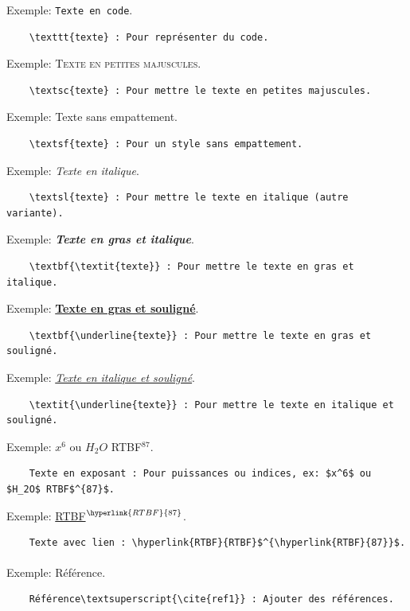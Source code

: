 \documentclass[a4paper, 12pt]{article}
\begin{document}
    Exemple: \texttt{Texte en code}.
    \begin{verbatim}
    \texttt{texte} : Pour représenter du code.
    \end{verbatim}
    
    Exemple: \textsc{Texte en petites majuscules}.
    \begin{verbatim}
    \textsc{texte} : Pour mettre le texte en petites majuscules.
    \end{verbatim}
    
    Exemple: \textsf{Texte sans empattement}.
    \begin{verbatim}
    \textsf{texte} : Pour un style sans empattement.
    \end{verbatim}
    
    Exemple: \textsl{Texte en italique}.
    \begin{verbatim}
    \textsl{texte} : Pour mettre le texte en italique (autre variante).
    \end{verbatim}
    
    Exemple: \textbf{\textit{Texte en gras et italique}}.
    \begin{verbatim}
    \textbf{\textit{texte}} : Pour mettre le texte en gras et italique.
    \end{verbatim}

    Exemple: \textbf{\underline{Texte en gras et souligné}}.
    \begin{verbatim}
    \textbf{\underline{texte}} : Pour mettre le texte en gras et souligné.
    \end{verbatim}

    Exemple: \textit{\underline{Texte en italique et souligné}}.
    \begin{verbatim}
    \textit{\underline{texte}} : Pour mettre le texte en italique et souligné.
    \end{verbatim}

    Exemple: $x^6$ ou $H_2O$ RTBF$^{87}$.
    \begin{verbatim}
    Texte en exposant : Pour puissances ou indices, ex: $x^6$ ou $H_2O$ RTBF$^{87}$.
    \end{verbatim}

    Exemple: \hyperlink{RTBF}{RTBF}$^{\hyperlink{RTBF}{87}}$.
    \begin{verbatim}
    Texte avec lien : \hyperlink{RTBF}{RTBF}$^{\hyperlink{RTBF}{87}}$.
    \end{verbatim}
    
    Exemple: Référence\textsuperscript{\cite{ref1}}.
    \begin{verbatim}
    Référence\textsuperscript{\cite{ref1}} : Ajouter des références.
    \end{verbatim}
\end{document}
